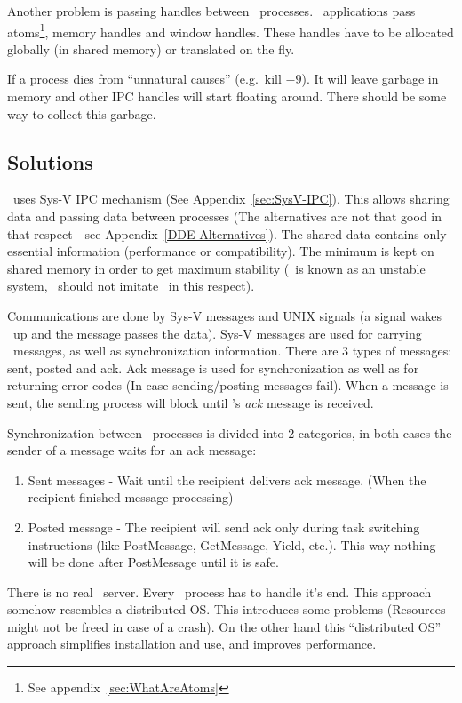 Another problem is passing handles between \Wine\ processes. \windoz\
applications pass atoms\footnote{See appendix~\ref{sec:WhatAreAtoms}},
memory handles and window handles. These handles have to be allocated
globally (in shared memory) or translated on the fly.


If a process dies from ``unnatural causes'' (e.g.\ kill $-9$). It will
leave garbage in memory and other IPC handles will start floating
around. There should be some way to collect this garbage.

\subsection{Solutions}
\label{sec:ProjSolutions}
\Wine\ uses Sys-V IPC mechanism (See
Appendix~\ref{sec:SysV-IPC}). This allows sharing data and passing
data between processes (The alternatives are not that good in that
respect - see Appendix~\ref{DDE-Alternatives}).
The shared data contains only essential information (performance or
compatibility). The minimum is kept on shared memory in order to get
maximum stability (\windoz\ is known as an unstable system, \Wine\
should not imitate \windoz\ in this respect).

Communications are done by Sys-V messages and UNIX signals (a signal
wakes \Wine\ up and the message passes the data). Sys-V messages are
used for carrying \windoz\ messages, as well as synchronization
information. There are 3 types of messages: sent, posted and ack.
Ack message is used for synchronization as well as for returning error
codes (In case sending/posting messages fail). When a message is sent,
the sending process will block until \Wine's {\em ack}{} message is
received.

Synchronization between \Wine\ processes is divided into 2 categories,
in both cases the sender of a message waits for an ack message:
\begin{enumerate}
  \item Sent messages - Wait until the recipient delivers ack message.
    (When the recipient finished message processing) 
  \item Posted message - The recipient will send ack only during
    task switching instructions (like PostMessage, GetMessage, Yield,
    etc.). This way nothing will be done after PostMessage until it is
    safe. 
\end{enumerate}

There is no real \Wine\ server. Every \Wine\ process has to handle
it's end. This approach somehow resembles a distributed OS\@. This
introduces some problems (Resources might not be freed in case of a
crash). On the other hand this ``distributed OS'' approach simplifies
installation and use, and improves performance.

